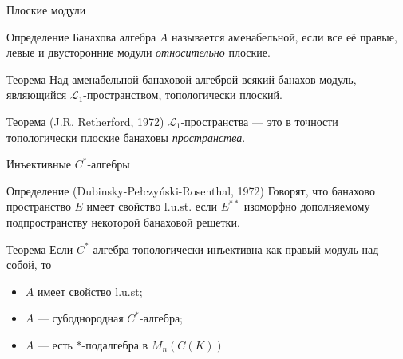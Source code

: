\documentclass[9pt,pdf,utf8,russian]{beamer}
\begin{document}
\begin{frame}{Плоские модули}
    \pause
    \begin{block}{Определение}
        Банахова алгебра $A$ называется аменабельной, если все её правые,
        левые и двусторонние	 модули \textit{относительно} плоские.
    \end{block}
    \pause
    \begin{alertblock}{Теорема}
        Над аменабельной банаховой алгеброй всякий банахов модуль,
        являющийся $\mathscr{L}_1$-пространством, топологически плоский.
    \end{alertblock}
    \pause
    \begin{block}{Теорема (J.R. Retherford, 1972)}
        $\mathscr{L}_1$-пространства --- это в точности топологически плоские
        банаховы \textit{пространства}.
    \end{block}
\end{frame}

\begin{frame}{Инъективные $C^*$-алгебры}
    \begin{block}{Определение (Dubinsky-Pełczyński-Rosenthal, 1972)}
        Говорят, что банахово пространство $E$ имеет свойство l.u.st. если
        $E^{**}$ изоморфно дополняемому подпространству некоторой
        банаховой решетки.
    \end{block}
    \pause
    \begin{alertblock}{Теорема}
        Если $C^*$-алгебра топологически инъективна как правый модуль над
        собой, то
        \begin{itemize}
            \item $A$ имеет свойство l.u.st;
            \item $A$ --- субоднородная $C^*$-алгебра;
            \item $A$ --- есть $*$-подалгебра в $M_n(C(K))$
        \end{itemize}
    \end{alertblock}
\end{frame}
\end{document}
